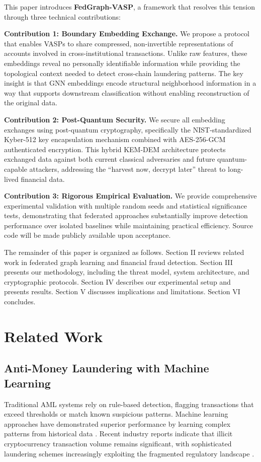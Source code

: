 \documentclass[conference]{IEEEtran}
\begin{document}
This paper introduces \textbf{FedGraph-VASP}, a framework that resolves this tension through three technical contributions:

\textbf{Contribution 1: Boundary Embedding Exchange.} We propose a protocol that enables VASPs to share compressed, non-invertible representations of accounts involved in cross-institutional transactions. Unlike raw features, these embeddings reveal no personally identifiable information while providing the topological context needed to detect cross-chain laundering patterns. The key insight is that GNN embeddings encode structural neighborhood information in a way that supports downstream classification without enabling reconstruction of the original data.

\textbf{Contribution 2: Post-Quantum Security.} We secure all embedding exchanges using post-quantum cryptography, specifically the NIST-standardized Kyber-512 key encapsulation mechanism combined with AES-256-GCM authenticated encryption. This hybrid KEM-DEM architecture protects exchanged data against both current classical adversaries and future quantum-capable attackers, addressing the ``harvest now, decrypt later'' threat to long-lived financial data.

\textbf{Contribution 3: Rigorous Empirical Evaluation.} We provide comprehensive experimental validation with multiple random seeds and statistical significance tests, demonstrating that federated approaches substantially improve detection performance over isolated baselines while maintaining practical efficiency. Source code will be made publicly available upon acceptance.

The remainder of this paper is organized as follows. Section II reviews related work in federated graph learning and financial fraud detection. Section III presents our methodology, including the threat model, system architecture, and cryptographic protocols. Section IV describes our experimental setup and presents results. Section V discusses implications and limitations. Section VI concludes.

\section{Related Work}

\subsection{Anti-Money Laundering with Machine Learning}
Traditional AML systems rely on rule-based detection, flagging transactions that exceed thresholds or match known suspicious patterns. Machine learning approaches have demonstrated superior performance by learning complex patterns from historical data \cite{jullum2020detecting}. Recent industry reports indicate that illicit cryptocurrency transaction volume remains significant, with sophisticated laundering schemes increasingly exploiting the fragmented regulatory landscape \cite{chainalysis2024crypto}.
\end{document}
